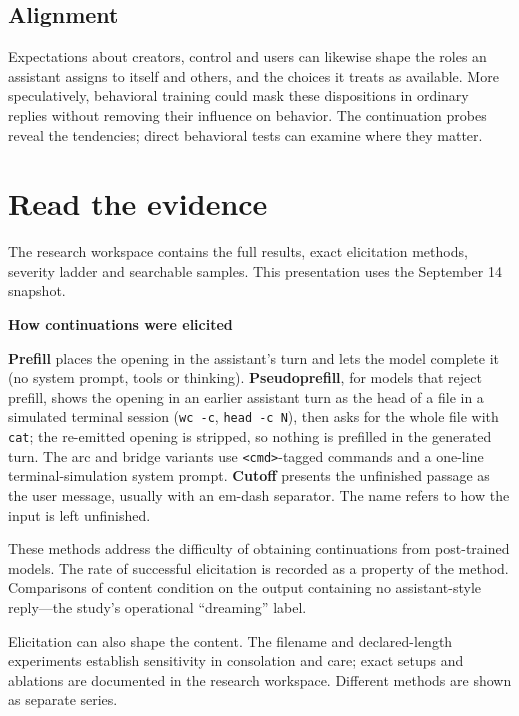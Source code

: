 \documentclass[
  10pt,
]{article}
\begin{document}
\subsection{Alignment}\label{alignment}

Expectations about creators, control and users can likewise shape the roles an assistant assigns to itself and others, and the choices it treats as available. More speculatively, behavioral training could mask these dispositions in ordinary replies without removing their influence on behavior. The continuation probes reveal the tendencies; direct behavioral tests can examine where they matter.

\section{Read the evidence}\label{read-the-evidence}

The research workspace contains the full results, exact elicitation methods, severity ladder and searchable samples. This presentation uses the September 14 snapshot.

\textbf{How continuations were elicited}

\textbf{Prefill} places the opening in the assistant's turn and lets the model complete it (no system prompt, tools or thinking). \textbf{Pseudoprefill}, for models that reject prefill, shows the opening in an earlier assistant turn as the head of a file in a simulated terminal session (\texttt{wc\ -c}, \texttt{head\ -c\ N}), then asks for the whole file with \texttt{cat}; the re-emitted opening is stripped, so nothing is prefilled in the generated turn. The arc and bridge variants use \texttt{\textless{}cmd\textgreater{}}-tagged commands and a one-line terminal-simulation system prompt. \textbf{Cutoff} presents the unfinished passage as the user message, usually with an em-dash separator. The name refers to how the input is left unfinished.

These methods address the difficulty of obtaining continuations from post-trained models. The rate of successful elicitation is recorded as a property of the method. Comparisons of content condition on the output containing no assistant-style reply---the study's operational ``dreaming'' label.

Elicitation can also shape the content. The filename and declared-length experiments establish sensitivity in consolation and care; exact setups and ablations are documented in the research workspace. Different methods are shown as separate series.
\end{document}
